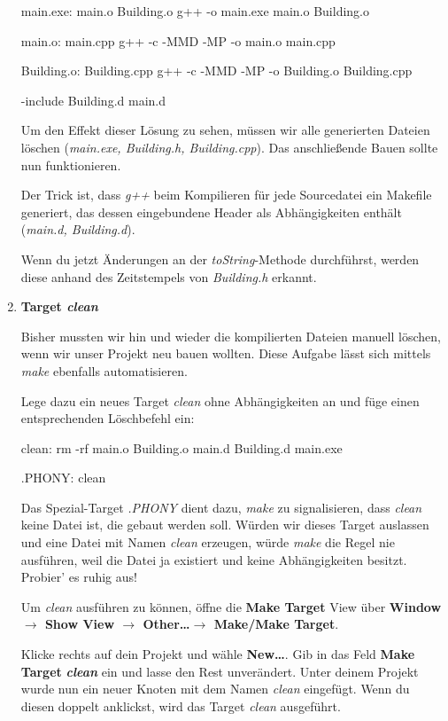 \begin{enumerate}
\begin{lstmake}
main.exe: main.o Building.o
	g++ -o main.exe main.o Building.o

main.o: main.cpp
	g++ -c -MMD -MP -o main.o main.cpp

Building.o: Building.cpp
	g++ -c -MMD -MP -o Building.o Building.cpp

-include Building.d main.d
\end{lstmake}

Um den Effekt dieser Lösung zu sehen, müssen wir alle generierten Dateien löschen (\emph{main.exe, Building.h, Building.cpp}).
Das anschließende Bauen sollte nun funktionieren.

Der Trick ist, dass \emph{g++} beim Kompilieren für jede Sourcedatei ein Makefile generiert, das dessen eingebundene Header als Abhängigkeiten enthält (\emph{main.d, Building.d}).

Wenn du jetzt Änderungen an der \emph{toString}-Methode durchführst, werden diese anhand des Zeitstempels von \emph{Building.h} erkannt.




\item\textbf{Target \emph{clean}}

Bisher mussten wir hin und wieder die kompilierten Dateien manuell löschen, wenn wir unser Projekt neu bauen wollten.
Diese Aufgabe lässt sich mittels \emph{make} ebenfalls automatisieren.

Lege dazu ein neues Target \emph{clean} ohne Abhängigkeiten an und füge einen entsprechenden Löschbefehl ein:
\begin{lstmake}
clean:
	rm -rf main.o Building.o main.d Building.d main.exe

.PHONY: clean
\end{lstmake}
Das Spezial-Target \emph{.PHONY} dient dazu, \emph{make} zu signalisieren, dass \emph{clean} keine Datei ist, die gebaut werden soll.
Würden wir dieses Target auslassen und eine Datei mit Namen \emph{clean} erzeugen, würde \emph{make} die Regel nie ausführen, weil die Datei ja existiert und keine Abhängigkeiten besitzt.
Probier' es ruhig aus!

Um \emph{clean} ausführen zu können, öffne die \textbf{Make Target} View über \textbf{Window $\to$ Show View $\to$ Other\dots $\to$ Make/Make Target}.

Klicke rechts auf dein Projekt und wähle \textbf{New\dots}.
Gib in das Feld \textbf{Make Target} \textbf{\emph{clean}} ein und lasse den Rest unverändert.
Unter deinem Projekt wurde nun ein neuer Knoten mit dem Namen \emph{clean} eingefügt.
Wenn du diesen doppelt anklickst, wird das Target \emph{clean} ausgeführt.


\end{enumerate}
